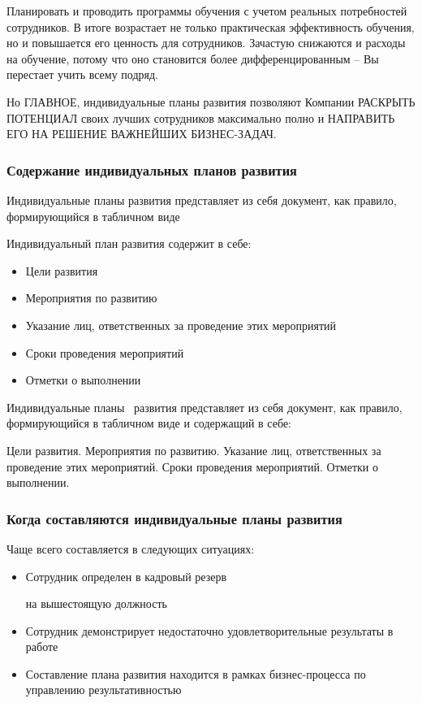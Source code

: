 \documentclass{../industrial-development}
\begin{document}
	Планировать и проводить программы обучения с учетом реальных потребностей сотрудников. В итоге возрастает не только практическая эффективность обучения, но и повышается его ценность для сотрудников. Зачастую снижаются и расходы на обучение, потому что оно становится более дифференцированным – Вы перестает учить всему подряд.


Но ГЛАВНОЕ, индивидуальные планы развития позволяют Компании РАСКРЫТЬ ПОТЕНЦИАЛ своих лучших сотрудников максимально полно и НАПРАВИТЬ ЕГО НА РЕШЕНИЕ ВАЖНЕЙШИХ БИЗНЕС-ЗАДАЧ.

\begin{frame} \frametitle{Содержание индивидуальных планов развития}
  \begin{block}{ }
Индивидуальные планы развития представляет из себя документ, как правило, формирующийся в табличном виде 
  \end{block}

  \bigskip
Индивидуальный план развития содержит в себе:  
   \begin{itemize}
  \item Цели развития
  \item Мероприятия по развитию
  \item	 Указание лиц, ответственных за проведение этих мероприятий
 \item	Сроки проведения мероприятий
 \item	Отметки о выполнении
  \end{itemize}
\end{frame}

\lecturenotes

Индивидуальные планы~\cite{IPlan} развития представляет из себя документ, как правило, формирующийся в табличном виде и содержащий в себе:

  Цели развития.
 Мероприятия по развитию.
  Указание лиц, ответственных за проведение этих мероприятий.
 Сроки проведения мероприятий.
Отметки о выполнении.

\begin{frame} \frametitle{Когда составляются индивидуальные планы развития }
  \begin{block}{ }
Чаще всего составляется в следующих ситуациях:

  \end{block}
  
   \begin{itemize}
   только что принят на работу
  \item Сотрудник определен в кадровый резерв 

на вышестоящую должность
  \item	 Сотрудник демонстрирует недостаточно удовлетворительные результаты в работе
 \item	Составление плана развития находится в рамках бизнес-процесса по управлению результативностью
  \end{itemize}
\end{frame}
\end{document}
